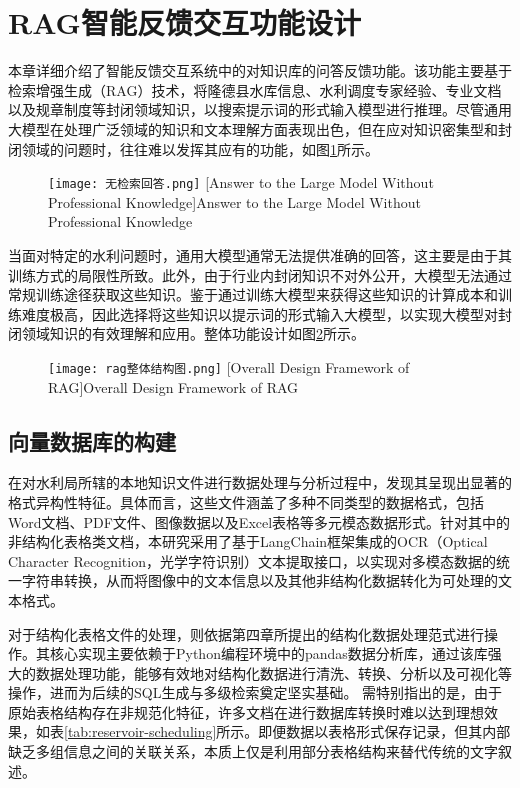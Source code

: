 \section{RAG智能反馈交互功能设计}
本章详细介绍了智能反馈交互系统中的对知识库的问答反馈功能。该功能主要基于检索增强生成（RAG）技术，将隆德县水库信息、水利调度专家经验、专业文档以及规章制度等封闭领域知识，以搜索提示词的形式输入模型进行推理。尽管通用大模型在处理广泛领域的知识和文本理解方面表现出色，但在应对知识密集型和封闭领域的问题时，往往难以发挥其应有的功能，如图\ref{fig:无检索}所示。
\begin{figure}[!htb]
    \centering
    \texttt{[image: 无检索回答.png]}
    [Answer to the Large Model Without Professional Knowledge]{Answer to the Large Model Without Professional Knowledge}
    \label{fig:无检索}
\end{figure}
当面对特定的水利问题时，通用大模型通常无法提供准确的回答，这主要是由于其训练方式的局限性所致。此外，由于行业内封闭知识不对外公开，大模型无法通过常规训练途径获取这些知识。鉴于通过训练大模型来获得这些知识的计算成本和训练难度极高，因此选择将这些知识以提示词的形式输入大模型，以实现大模型对封闭领域知识的有效理解和应用。整体功能设计如图\ref{fig:rag整体结构图}所示。
\begin{figure}[h]
    \centering
    \texttt{[image: rag整体结构图.png]}
    [Overall Design Framework of RAG]{Overall Design Framework of RAG}
    \label{fig:rag整体结构图}
\end{figure}
\subsection{向量数据库的构建}
在对水利局所辖的本地知识文件进行数据处理与分析过程中，发现其呈现出显著的格式异构性特征。具体而言，这些文件涵盖了多种不同类型的数据格式，包括Word文档、PDF文件、图像数据以及Excel表格等多元模态数据形式。针对其中的非结构化表格类文档，本研究采用了基于LangChain框架集成的OCR\cite{sarzynska2021detecting,tian2016detecting}（Optical Character Recognition，光学字符识别）文本提取接口，以实现对多模态数据的统一字符串转换，从而将图像中的文本信息以及其他非结构化数据转化为可处理的文本格式。

对于结构化表格文件的处理，则依据第四章所提出的结构化数据处理范式进行操作。其核心实现主要依赖于Python编程环境中的pandas数据分析库，通过该库强大的数据处理功能，能够有效地对结构化数据进行清洗、转换、分析以及可视化等操作，进而为后续的SQL生成与多级检索奠定坚实基础。
需特别指出的是，由于原始表格结构存在非规范化特征，许多文档在进行数据库转换时难以达到理想效果，如表\ref{tab:reservoir-scheduling}所示。即便数据以表格形式保存记录，但其内部缺乏多组信息之间的关联关系，本质上仅是利用部分表格结构来替代传统的文字叙述。

